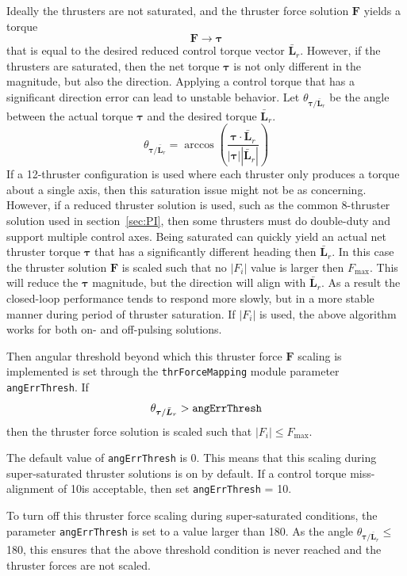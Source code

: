 Ideally the thrusters are not saturated, and the thruster force solution $\bm F$ yields a torque
\begin{equation*}
	[D]\bm F \rightarrow \bm\tau
\end{equation*}
that is equal to the desired reduced control torque vector $\bar{\bm L}_{r}$.  However, if the thrusters are saturated, then the net torque $\bm\tau$ is not only different in the magnitude, but also the direction.  Applying a control torque that has a significant direction error can lead to unstable behavior.  Let $\theta_{\bm\tau/\bar{\bm L}_{r}}$ be the angle between the actual torque $\bm\tau$ and the desired torque $\bar{\bm L}_{r}$. 
\begin{equation}
	\theta_{\bm\tau/\bar{\bm L}_{r}} = \arccos \left( \frac{\bm\tau \cdot \bar{\bm L}_{r}}{|\bm\tau| |\bar{\bm L}_{r}|} \right)
\end{equation}
If a 12-thruster configuration is used where each thruster only produces a torque about a single axis, then this saturation issue might not be as concerning.  However, if a reduced thruster solution is used, such as the common 8-thruster solution used in section~\ref{sec:PI}, then some thrusters must do double-duty and support multiple control axes.  Being saturated can quickly yield an actual net thruster torque $\bm \tau$ that has a significantly different heading then $\bar{\bm L}_{r}$.  In this case the thruster solution $\bm F$ is scaled such that no $|F_{i}|$ value is larger  then $F_{\text{max}}$.  This will reduce the $\bm\tau$ magnitude, but the direction will align with $\bar{\bm L}_{r}$.  As a result the closed-loop performance tends to respond more slowly, but in a more stable manner during period of thruster saturation.  If $|F_{i}|$ is used, the above algorithm works for both on- and off-pulsing solutions.  

Then angular threshold beyond which this thruster force $\bm F$ scaling is implemented is set through the  {\tt thrForceMapping} module parameter {\tt angErrThresh}.  If 
$$
	\theta_{\bm\tau/\bar{\bm L}_{r}} > \text{\tt angErrThresh}
$$
then the thruster force solution is scaled such that $|F_{i}| \le F_{\text{max}}$.  

The default value of {\tt angErrThresh} is 0\dg.  This means that this scaling during super-saturated thruster solutions is on by default.  If a control torque miss-alignment of 10\dg is acceptable, then set {\tt angErrThresh} = 10\dg.  

To turn off this thruster force scaling during super-saturated conditions, the parameter  {\tt angErrThresh} is set to a value larger than 180\dg.  As the angle $\theta_{\bm\tau/\bar{\bm L}_{r}} \le $180\dg, this ensures that the above threshold condition is never reached and the thruster forces are not scaled.  


